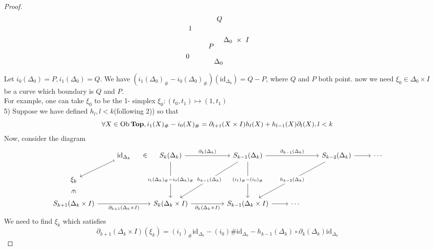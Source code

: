 \documentclass{article}
\begin{document}
\begin{proof}
\[\begin{tikzpicture}[x=0.75pt,y=0.75pt,yscale=-1,xscale=1]
        \draw (77,129.4) node [anchor=north west][inner sep=0.75pt]    {$0$};
        \draw (131,138.4) node [anchor=north west][inner sep=0.75pt]    {$\Delta _{0}$};
        \draw (82,75.4) node [anchor=north west][inner sep=0.75pt]    {$1$};
        \draw (149,96.4) node [anchor=north west][inner sep=0.75pt]    {$\Delta _{0} \ \times \ I$};
        \draw (136,56.4) node [anchor=north west][inner sep=0.75pt]    {$Q$};
        \draw (120,109.4) node [anchor=north west][inner sep=0.75pt]    {$P$};
        
        
        \end{tikzpicture}\]
Let $i_0(\Delta_0) = P,i_1(\Delta_0) = Q$. We have $(i_1(\Delta_0)_\# - i_0(\Delta_0)_\#)(\text{id}_{\Delta_0}) = Q - P$, where $Q$ and $P$ both point. now we need $\xi_0 \in \Delta_0 \times I$ be a curve which boundary is $Q$ and $P$.\\
For example, one can take $\xi_0$ to be the 1- simplex $\xi_0 : (t_0,t_1) \mapsto (1,t_1)$\\
5) Suppose we have defined $h_l ,l <k$(following 2)) so that
$$
\forall X \in \operatorname{Ob}\bold{Top}, i_1(X)_\# - i_0(X)_\# = \partial_{l+1}(X \times I)h_l(X) + h_{l-1}(X)\partial_l(X),l <k
$$
Now, consider the diagram
\[\begin{tikzcd}
	& {\text{id}_{\Delta_k}} & {S_k(\Delta_k)} && {S_{k-1}(\Delta_k)} && {S_{k-2}(\Delta_k)} & \cdots \\
	{\xi_k} \\
	{S_{k+1}(\Delta_k \times I)} && {S_k(\Delta_k\times I)} && {S_{k-1}(\Delta_k\times I)} & \cdots
	\arrow["{(i_1)_\# - (i_0)_\#}"{description}, from=1-5, to=3-5]
	\arrow["{i_1(\Delta_k)_\# - i_0(\Delta_k)_\#}"{description}, from=1-3, to=3-3]
	\arrow["{\partial_k(\Delta_k)}", from=1-3, to=1-5]
	\arrow["{\partial_k(\Delta_k \times I)}"', from=3-3, to=3-5]
	\arrow["{h_{k-1}(\Delta_k)}"{description}, from=1-5, to=3-3]
	\arrow["{\partial_{k-1}(\Delta_k)}", from=1-5, to=1-7]
	\arrow["{h_{k-2}(\Delta_k)}"{description}, from=1-7, to=3-5]
	\arrow["{\partial_{k+1}(\Delta_k \times I)}"', from=3-1, to=3-3]
	\arrow["\in"{marking}, draw=none, from=1-2, to=1-3]
	\arrow[maps to, from=1-2, to=2-1]
	\arrow["\in"{marking}, draw=none, from=2-1, to=3-1]
	\arrow[from=3-5, to=3-6]
	\arrow[from=1-7, to=1-8]
\end{tikzcd}\]
We need to find $\xi_k$ which satisfies
$$
\partial_{k+1}(\Delta_k \times I)(\xi_k) = (i_1)_\#\text{id}_{\Delta_k} - (i_0)\#\text{id}_{\Delta_k} -h_{k-1} (\Delta_k)\circ \partial_{k}(\Delta_k)\text{id}_{\Delta_k}
$$
\end{proof}
\end{document}
